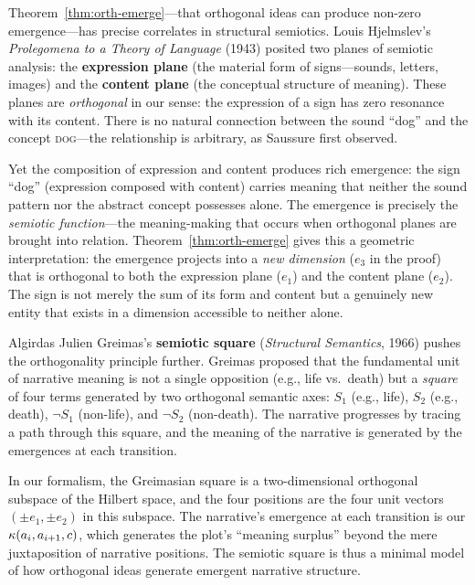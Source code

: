 \begin{interpretation}
\label{interp:ch12:hjelmslev_greimas}
Theorem~\ref{thm:orth-emerge}---that orthogonal ideas can produce non-zero
emergence---has precise correlates in structural semiotics.  Louis
Hjelmslev's \emph{Prolegomena to a Theory of Language} (1943) posited two
planes of semiotic analysis: the \textbf{expression plane} (the material
form of signs---sounds, letters, images) and the \textbf{content plane}
(the conceptual structure of meaning).  These planes are \emph{orthogonal}
in our sense: the expression of a sign has zero resonance with its content.
There is no natural connection between the sound ``dog'' and the concept
\textsc{dog}---the relationship is arbitrary, as Saussure first observed.

Yet the composition of expression and content produces rich emergence:
the sign ``dog'' (expression composed with content) carries meaning that
neither the sound pattern nor the abstract concept possesses alone.  The
emergence is precisely the \emph{semiotic function}---the meaning-making
that occurs when orthogonal planes are brought into relation.
Theorem~\ref{thm:orth-emerge} gives this a geometric interpretation: the
emergence projects into a \emph{new dimension} ($e_3$ in the proof) that
is orthogonal to both the expression plane ($e_1$) and the content plane
($e_2$).  The sign is not merely the sum of its form and content but a
genuinely new entity that exists in a dimension accessible to neither alone.

Algirdas Julien Greimas's \textbf{semiotic square} (\emph{Structural
Semantics}, 1966) pushes the orthogonality principle further.  Greimas
proposed that the fundamental unit of narrative meaning is not a single
opposition (e.g., life vs.\ death) but a \emph{square} of four terms
generated by two orthogonal semantic axes: $S_1$ (e.g., life), $S_2$ (e.g.,
death), $\neg S_1$ (non-life), and $\neg S_2$ (non-death).  The narrative
progresses by tracing a path through this square, and the meaning of the
narrative is generated by the emergences at each transition.

In our formalism, the Greimasian square is a two-dimensional orthogonal
subspace of the Hilbert space, and the four positions are the four unit
vectors $(\pm e_1, \pm e_2)$ in this subspace.  The narrative's emergence
at each transition is our $\kappa(a_i, a_{i+1}, c)$, which generates the
plot's ``meaning surplus'' beyond the mere juxtaposition of narrative
positions.  The semiotic square is thus a minimal model of how orthogonal
ideas generate emergent narrative structure.
\end{interpretation}



